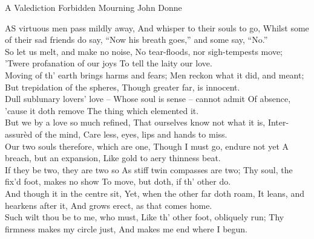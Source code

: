 
\begin{poem}
{A Valediction Forbidden Mourning}
{John Donne}

AS virtuous men pass mildly away, 
And whisper to their souls to go, 
Whilst some of their sad friends do say, 
``Now his breath goes,'' and some say, ``No.''\\

So let us melt, and make no noise,
No tear-floods, nor sigh-tempests move; 
'Twere profanation of our joys 
To tell the laity our love.\\

Moving of th' earth brings harms and fears; 
Men reckon what it did, and meant; 
But trepidation of the spheres, 
Though greater far, is innocent.\\

Dull sublunary lovers' love 
-- Whose soul is sense -- cannot admit 
Of absence, 'cause it doth remove 
The thing which elemented it.\\

But we by a love so much refined, 
That ourselves know not what it is, 
Inter-assur\`{e}d of the mind, 
Care less, eyes, lips and hands to miss.\\

Our two souls therefore, which are one, 
Though I must go, endure not yet 
A breach, but an expansion, 
Like gold to aery thinness beat.\\

If they be two, they are two so 
As stiff twin compasses are two; 
Thy soul, the fix'd foot, makes no show 
To move, but doth, if th' other do.\\

And though it in the centre sit, 
Yet, when the other far doth roam, 
It leans, and hearkens after it, 
And grows erect, as that comes home.\\

Such wilt thou be to me, who must, 
Like th' other foot, obliquely run; 
Thy firmness makes my circle just, 
And makes me end where I begun.\\
\end{poem}

